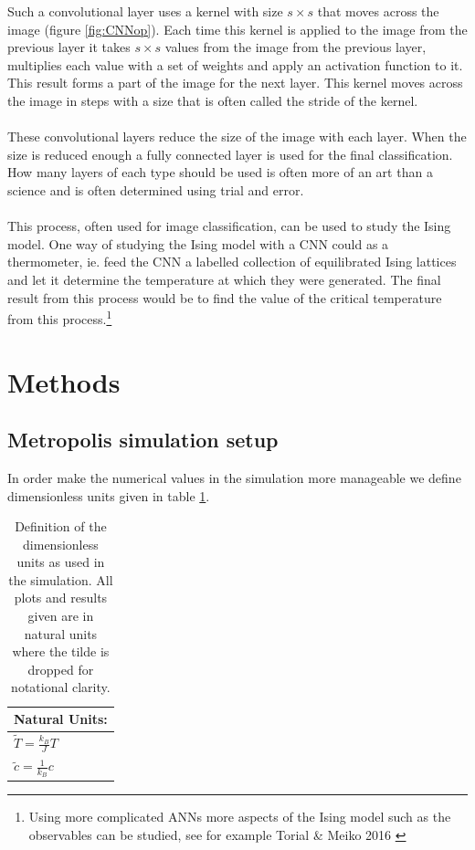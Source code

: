 \documentclass[10 pt, a4paper]{article}
\begin{document}
Such a convolutional layer uses a kernel with size $s \times s$ that moves across the image (figure \ref{fig:CNNop}). Each time this kernel is applied to the image from the previous layer it takes $s \times s$ values from the image from the previous layer, multiplies each value with a set of weights and apply an activation function to it. This result forms a part of the image for the next layer. This kernel moves across the image in steps with a size that is often called the stride of the kernel.
\\
\\
These convolutional layers reduce the size of the image with each layer. When the size is reduced enough a fully connected layer is used for the final classification. How many layers of each type should be used is often more of an art than a science and is often determined using trial and error.
\\
\\
This process, often used for image classification, can be used to study the Ising model. One way of studying the Ising model with a CNN could as a thermometer, ie. feed the CNN a labelled collection of equilibrated Ising lattices and let it determine the temperature at which they were generated. The final result from this process would be to find the value of the critical temperature from this process.\footnote{ Using more complicated ANNs more aspects of the Ising model such as the observables can be studied, see for example Torial \& Meiko 2016 \cite{IsingRBM}}


\section{Methods} \label{sec:meth}

\subsection{Metropolis simulation setup} \label{sec:simsetup}

In order make the numerical values in the simulation more manageable we define dimensionless units given in table \ref{tab:natunits}.

\begin{table}[H] 
\centering
\caption{Definition of the dimensionless units as used in the simulation. All plots and results given are in natural units where the tilde is dropped for notational clarity.  \label{tab:natunits}}
\begin{tabular}{l}
Natural Units:                                     \\ \hline
$\tilde{T} =  \frac{k_B}{J} T$                     \\
$\tilde{c} = \frac{1}{k_B} c$                   \\
\end{tabular}
\end{table}
\end{document}
